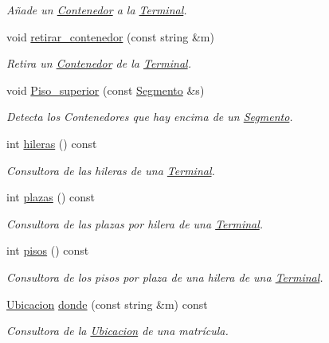 \begin{DoxyCompactItemize}
\begin{DoxyCompactList}\small\item\em Añade un \hyperlink{class_contenedor}{Contenedor} a la \hyperlink{class_terminal}{Terminal}. \end{DoxyCompactList}\item 
void \hyperlink{class_terminal_a4a5b00174efb9993ead60369d206375b}{retirar\+\_\+contenedor} (const string \&m)
\begin{DoxyCompactList}\small\item\em Retira un \hyperlink{class_contenedor}{Contenedor} de la \hyperlink{class_terminal}{Terminal}. \end{DoxyCompactList}\item 
void \hyperlink{class_terminal_a122e5521bd57ee9ac07db30f5f82a346}{Piso\+\_\+superior} (const \hyperlink{class_segmento}{Segmento} \&s)
\begin{DoxyCompactList}\small\item\em Detecta los Contenedores que hay encima de un \hyperlink{class_segmento}{Segmento}. \end{DoxyCompactList}\item 
int \hyperlink{class_terminal_a6e7268ad5b0ffbf1484f1f1522e800f0}{hileras} () const
\begin{DoxyCompactList}\small\item\em Consultora de las hileras de una \hyperlink{class_terminal}{Terminal}. \end{DoxyCompactList}\item 
int \hyperlink{class_terminal_a06602e79ec9e7bca40d73d7a6c436fe3}{plazas} () const
\begin{DoxyCompactList}\small\item\em Consultora de las plazas por hilera de una \hyperlink{class_terminal}{Terminal}. \end{DoxyCompactList}\item 
int \hyperlink{class_terminal_ae6e79d13bb240d038142256552ae0ec9}{pisos} () const
\begin{DoxyCompactList}\small\item\em Consultora de los pisos por plaza de una hilera de una \hyperlink{class_terminal}{Terminal}. \end{DoxyCompactList}\item 
\hyperlink{class_ubicacion}{Ubicacion} \hyperlink{class_terminal_a2847cb58fe61bb488f089bc67a1973fe}{donde} (const string \&m) const
\begin{DoxyCompactList}\small\item\em Consultora de la \hyperlink{class_ubicacion}{Ubicacion} de una matrícula. \end{DoxyCompactList}\item 

\end{DoxyCompactItemize}
